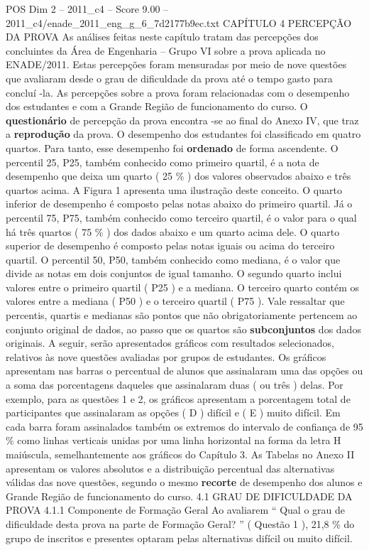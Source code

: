 \begin{textsample}{POS Dim 2 – 2011\_c4 – Score 9.00 – 2011\_c4/enade\_2011\_eng\_g\_6\_7d2177b9ec.txt}  \label{ex:f2_pos_130}
CAPÍTULO 4 PERCEPÇÃO DA PROVA As análises feitas neste capítulo tratam das percepções dos concluintes da Área de Engenharia – Grupo VI sobre a prova aplicada no ENADE/2011.
Estas percepções foram mensuradas por meio de nove questões que avaliaram desde o grau de dificuldade da prova até o tempo gasto para concluí -la.
As percepções sobre a prova foram relacionadas com o desempenho dos estudantes e com a Grande Região de funcionamento do curso.
O \textbf{questionário} de percepção da prova encontra -se ao final do Anexo IV, que traz a \textbf{reprodução} da prova.
O desempenho dos estudantes foi classificado em quatro quartos.
Para tanto, esse desempenho foi \textbf{ordenado} de forma ascendente.
O percentil 25, P25, também conhecido como primeiro quartil, é a nota de desempenho que deixa um quarto ( 25 \% ) dos valores observados abaixo e três quartos acima.
A Figura 1 apresenta uma ilustração deste conceito.
O quarto inferior de desempenho é composto pelas notas abaixo do primeiro quartil.
Já o percentil 75, P75, também conhecido como terceiro quartil, é o valor para o qual há três quartos ( 75 \% ) dos dados abaixo e um quarto acima dele.
O quarto superior de desempenho é composto pelas notas iguais ou acima do terceiro quartil.
O percentil 50, P50, também conhecido como mediana, é o valor que divide as notas em dois conjuntos de igual tamanho.
O segundo quarto inclui valores entre o primeiro quartil ( P25 ) e a mediana.
O terceiro quarto contém os valores entre a mediana ( P50 ) e o terceiro quartil ( P75 ).
Vale ressaltar que percentis, quartis e medianas são pontos que não obrigatoriamente pertencem ao conjunto original de dados, ao passo que os quartos são \textbf{subconjuntos} dos dados originais.
A seguir, serão apresentados gráficos com resultados selecionados, relativos às nove questões avaliadas por grupos de estudantes.
Os gráficos apresentam nas barras o percentual de alunos que assinalaram uma das opções ou a soma das porcentagens daqueles que assinalaram duas ( ou três ) delas.
Por exemplo, para as questões 1 e 2, os gráficos apresentam a porcentagem total de participantes que assinalaram as opções ( D ) difícil e ( E ) muito difícil.
Em cada barra foram assinalados também os extremos do intervalo de confiança de 95 \% como linhas verticais unidas por uma linha horizontal na forma da letra H maiúscula, semelhantemente aos gráficos do Capítulo 3.
As Tabelas no Anexo II apresentam os valores absolutos e a distribuição percentual das alternativas válidas das nove questões, segundo o mesmo \textbf{recorte} de desempenho dos alunos e Grande Região de funcionamento do curso. 4.1 GRAU DE DIFICULDADE DA PROVA 4.1.1 Componente de Formação Geral Ao avaliarem “ Qual o grau de dificuldade desta prova na parte de Formação Geral? ” ( Questão 1 ), 21,8 \% do grupo de inscritos e presentes optaram pelas alternativas difícil ou muito difícil.

\end{textsample}
